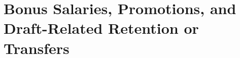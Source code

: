 \documentclass[11pt]{article}
\begin{document}
\section*{Bonus Salaries, Promotions, and Draft-Related Retention or Transfers}


\end{document}
